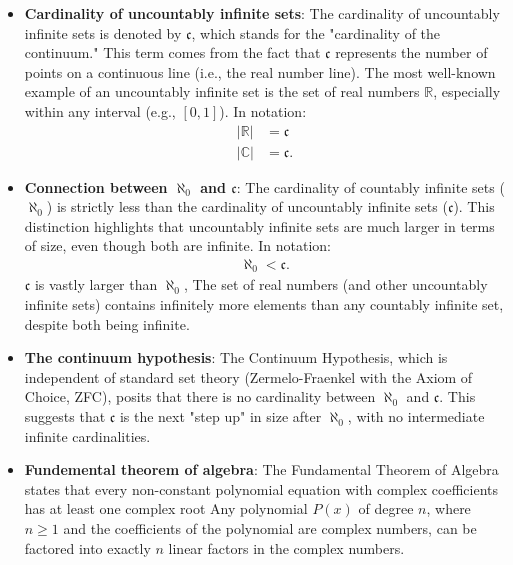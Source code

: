 \documentclass{report}
\begin{document}
\begin{itemize}
        \item \textbf{Cardinality of uncountably infinite sets}:
            The cardinality of uncountably infinite sets is denoted by \(\mathfrak{c}\), which stands for the "cardinality of the continuum."  This term comes from the fact that \(\mathfrak{c}\) represents the number of points on a continuous line (i.e., the real number line). 
            \bigbreak \noindent 
            The most well-known example of an uncountably infinite set is the set of real numbers \(\mathbb{R}\), especially within any interval (e.g., \([0,1]\)).
            \bigbreak \noindent 
            In notation: 
            \begin{align*}
                |\mathbb{R}| &= \mathfrak{c} \\
                |\mathbb{C}| &= \mathfrak{c}
            .\end{align*}
        \item \textbf{Connection between $\aleph_{0}$ and $\mathfrak{c} $}: The cardinality of countably infinite sets (\(\aleph_0\)) is strictly less than the cardinality of uncountably infinite sets (\(\mathfrak{c}\)). This distinction highlights that uncountably infinite sets are much larger in terms of size, even though both are infinite.
            \bigbreak \noindent 
            In notation: 
            \begin{align*}
                \aleph_0 < \mathfrak{c}
            .\end{align*}
            \bigbreak \noindent 
            $\mathfrak{c}$ is vastly larger than $\aleph_{0}$, The set of real numbers (and other uncountably infinite sets) contains infinitely more elements than any countably infinite set, despite both being infinite.
        \item \textbf{The continuum hypothesis}: The Continuum Hypothesis, which is independent of standard set theory (Zermelo-Fraenkel with the Axiom of Choice, ZFC), posits that there is no cardinality between \(\aleph_0\) and \(\mathfrak{c}\). This suggests that \(\mathfrak{c}\) is the next "step up" in size after \(\aleph_0\), with no intermediate infinite cardinalities.
        \item \textbf{Fundemental theorem of algebra}: The Fundamental Theorem of Algebra states that every non-constant polynomial equation with complex coefficients has at least one complex root
            \bigbreak \noindent 
            Any polynomial $P(x)$ of degree $n$, where $n \geq1$ and the coefficients of the polynomial are complex numbers, can be factored into exactly $n$ linear factors in the complex numbers.

\end{itemize}
\end{document}
